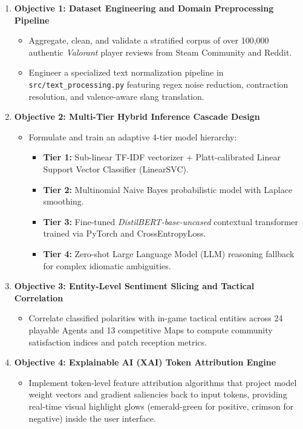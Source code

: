 \begin{enumerate}
    \item \textbf{Objective 1: Dataset Engineering and Domain Preprocessing Pipeline}
    \begin{itemize}
        \item Aggregate, clean, and validate a stratified corpus of over 100,000 authentic \textit{Valorant} player reviews from Steam Community and Reddit.
        \item Engineer a specialized text normalization pipeline in \texttt{src/text\_processing.py} featuring regex noise reduction, contraction resolution, and valence-aware slang translation.
    \end{itemize}

    \item \textbf{Objective 2: Multi-Tier Hybrid Inference Cascade Design}
    \begin{itemize}
        \item Formulate and train an adaptive 4-tier model hierarchy:
        \begin{itemize}
            \item \textbf{Tier 1:} Sub-linear TF-IDF vectorizer + Platt-calibrated Linear Support Vector Classifier (LinearSVC).
            \item \textbf{Tier 2:} Multinomial Naive Bayes probabilistic model with Laplace smoothing.
            \item \textbf{Tier 3:} Fine-tuned \textit{DistilBERT-base-uncased} contextual transformer trained via PyTorch and CrossEntropyLoss.
            \item \textbf{Tier 4:} Zero-shot Large Language Model (LLM) reasoning fallback for complex idiomatic ambiguities.
        \end{itemize}
    \end{itemize}

    \item \textbf{Objective 3: Entity-Level Sentiment Slicing and Tactical Correlation}
    \begin{itemize}
        \item Correlate classified polarities with in-game tactical entities across 24 playable Agents and 13 competitive Maps to compute community satisfaction indices and patch reception metrics.
    \end{itemize}

    \item \textbf{Objective 4: Explainable AI (XAI) Token Attribution Engine}
    \begin{itemize}
        \item Implement token-level feature attribution algorithms that project model weight vectors and gradient saliencies back to input tokens, providing real-time visual highlight glows (emerald-green for positive, crimson for negative) inside the user interface.
    \end{itemize}


\end{enumerate}
